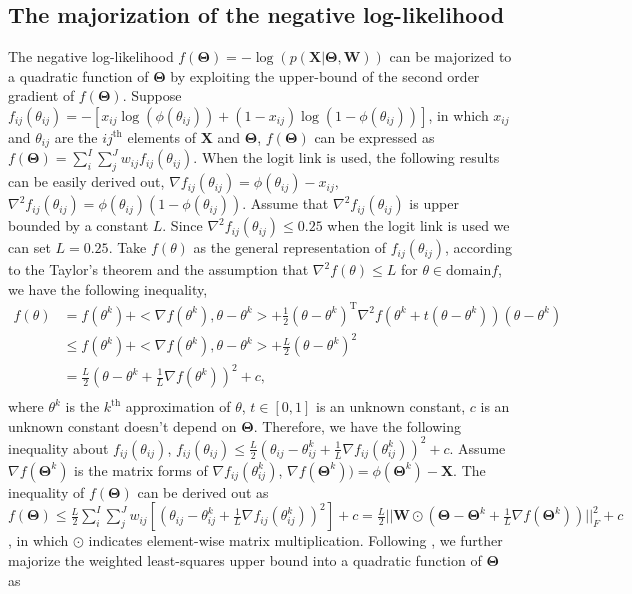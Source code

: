 \subsection{The majorization of the negative log-likelihood}
The negative log-likelihood $f(\mathbf{\Theta}) = -\log(p(\mathbf{X}|\mathbf{\Theta},\mathbf{W}))$ can be majorized to a quadratic function of $\mathbf{\Theta}$ by exploiting the upper-bound of the second order gradient of $f(\mathbf{\Theta})$. Suppose $f_{ij}(\theta_{ij}) = -\left[x_{ij}\log(\phi(\theta_{ij})) + (1-x_{ij})\log(1-\phi(\theta_{ij}))\right]$, in which $x_{ij}$ and $\theta_{ij}$ are the $ij^{\text{th}}$ elements of $\mathbf{X}$ and $\mathbf{\Theta}$, $f(\mathbf{\Theta})$ can be expressed as $f(\mathbf{\Theta}) = \sum_{i}^{I}\sum_{j}^{J} w_{ij} f_{ij}(\theta_{ij})$. When the logit link is used, the following results can be easily derived out, $\nabla f_{ij}(\theta_{ij}) = \phi(\theta_{ij}) - x_{ij}$, $\nabla^2 f_{ij}(\theta_{ij}) = \phi(\theta_{ij})(1-\phi(\theta_{ij}))$. Assume that $\nabla^2 f_{ij}(\theta_{ij})$ is upper bounded by a constant $L$. Since $\nabla^2 f_{ij}(\theta_{ij}) \leq 0.25$ when the logit link is used \cite{de2006principal} we can set $L=0.25$. Take $f(\theta)$ as the general representation of $f_{ij}(\theta_{ij})$, according to the Taylor's theorem and the assumption that $\nabla^2 f(\theta) \leq L$ for $\theta \in \text{domain}f$, we have the following inequality,
\begin{equation}\label{chapter3_eq:3}
\begin{aligned}
f(\theta) &= f(\theta^k) + <\nabla f(\theta^k), \theta-\theta^k> + \frac{1}{2}(\theta-\theta^k)^{\text{T}} \nabla^{2}f(\theta^k + t(\theta-\theta^k))(\theta-\theta^k) \\
          &\leq f(\theta^k) + <\nabla f(\theta^k), \theta-\theta^k> + \frac{L}{2}(\theta-\theta^k)^2 \\
          &= \frac{L}{2}(\theta-\theta^k + \frac{1}{L}\nabla f(\theta^k))^2 + c,\\
\end{aligned}
\end{equation}
where $\theta^k$ is the $k^{\text{th}}$ approximation of $\theta$, $t\in[0,1]$ is an unknown constant, $c$ is an unknown constant doesn't depend on $\mathbf{\Theta}$. Therefore, we have the following inequality about $f_{ij}(\theta_{ij})$,
$f_{ij}(\theta_{ij}) \leq \frac{L}{2}(\theta_{ij} - \theta_{ij}^k + \frac{1}{L}\nabla f_{ij}(\theta_{ij}^k ))^2 + c$. Assume $\nabla f(\mathbf{\Theta}^k)$ is the matrix forms of $\nabla f_{ij}(\theta_{ij}^k )$, $\nabla f(\mathbf{\Theta}^k)) = \phi(\mathbf{\Theta}^{k}) - \mathbf{X}$. The inequality of $f(\mathbf{\Theta})$ can be derived out as $f(\mathbf{\Theta})\leq \frac{L}{2} \sum_{i}^{I}\sum_{j}^{J} w_{ij}[(\theta_{ij} - \theta_{ij}^k + \frac{1}{L}\nabla f_{ij}(\theta_{ij}^k ))^2] + c = \frac{L}{2} ||\mathbf{W} \odot (\mathbf{\Theta} - \mathbf{\Theta}^k + \frac{1}{L} \nabla f(\mathbf{\Theta}^k))||_F^2 + c$, in which $\odot$ indicates element-wise matrix multiplication. Following \cite{kiers1997weighted}, we further majorize the weighted least-squares upper bound into a quadratic function of $\mathbf{\Theta}$ as
